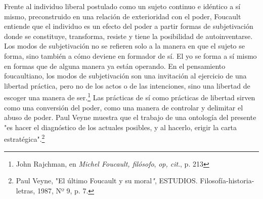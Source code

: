 Frente al individuo liberal postulado como un sujeto continuo e idéntico
a sí mismo, preconstruido en una relación de exterioridad con el poder,
Foucault entiende que el individuo es un efecto del poder a partir
formas de subjetivación donde se constituye, transforma, resiste y tiene
la posibilidad de autoinventarse. Los modos de subjetivación no se
refieren solo a la manera en que el sujeto se forma, sino también a cómo
deviene en formador de sí. El yo se forma a sí mismo en formas que de
alguna manera ya están operando. En el pensamiento foucaultiano, los
modos de subjetivación son una invitación al ejercicio de una libertad
práctica, pero no de los actos o de las intenciones, sino una libertad
de escoger una manera de ser.\footnote{John Rajchman, en \emph{Michel
  Foucault, filósofo}, \emph{op, cit}., p. 213} Las prácticas de sí como
prácticas de libertad sirven como una conversión del poder, como una
manera de controlar y delimitar el abuso de poder. Paul Veyne muestra
que el trabajo de una ontología del presente "es hacer el diagnóstico de
los actuales posibles, y al hacerlo, erigir la carta
estratégica".\footnote{Paul Veyne, "El último Foucault y su
  moral\emph{"}, ESTUDIOS. Filosofía-historia-letras, 1987, Nº 9, p. 7.}

